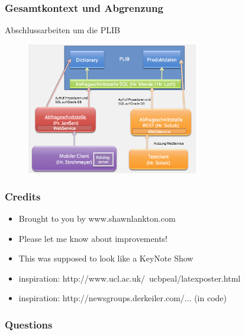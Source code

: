 \documentclass[serif,mathserif]{beamer}
\begin{document}
\begin{frame}
  \frametitle{Gesamtkontext und Abgrenzung}
    Abschlussarbeiten um die PLIB
  \begin{figure}[t]
    \includegraphics[width=7.5cm]{images/gesamtkontext_plib.png}
  \end{figure}
\end{frame}


\begin{frame}
  \frametitle{Credits}
  \begin{itemize}
  \item Brought to you by www.shawnlankton.com
  \item Please let me know about improvements!
  \item This was supposed to look like a KeyNote Show
  \item inspiration: http://www.ucl.ac.uk/~ucbpeal/latexposter.html
  \item inspiration: http://newsgroups.derkeiler.com/... (in code)
  \end{itemize}
\end{frame}

\begin{frame}
  \frametitle{Questions}
\end{frame}
\end{document}

